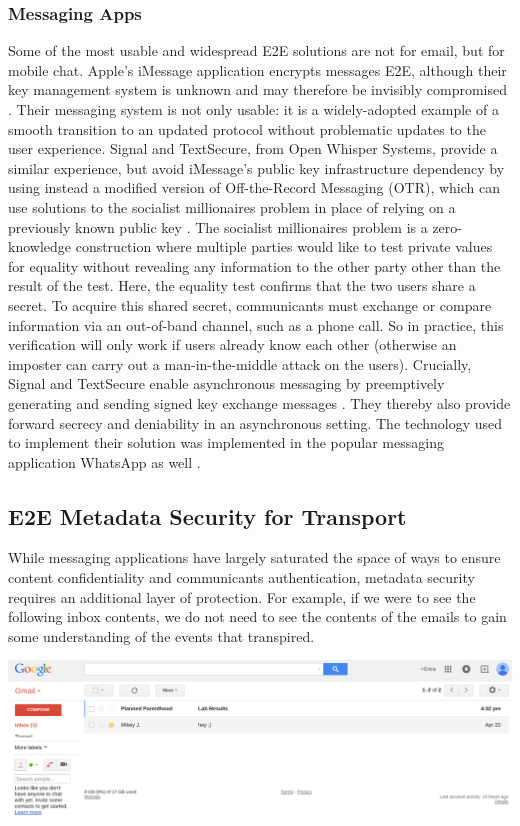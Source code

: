 \documentclass[pageno]{jpaper}
\begin{document}
\subsubsection{Messaging Apps}
Some of the most usable and widespread E2E solutions are not for email, but for mobile chat. Apple's iMessage application encrypts messages E2E, although their key management system is unknown and may therefore be invisibly compromised \cite{imessage}. Their messaging system is not only usable: it is a widely-adopted example of a smooth transition to an updated protocol without problematic updates to the user experience. Signal and TextSecure, from Open Whisper Systems, provide a similar experience, but avoid iMessage's public key infrastructure dependency by using instead a modified version of Off-the-Record Messaging (OTR), which can use solutions to the socialist millionaires problem in place of relying on a previously known public key \cite{borisov2004off}. The socialist millionaires problem is a zero-knowledge construction where multiple parties would like to test private values for equality without revealing any information to the other party other than the result of the test. Here, the equality test confirms that the two users share a secret. To acquire this shared secret, communicants must exchange or compare information via an out-of-band channel, such as a phone call. So in practice, this verification will only work if users already know each other (otherwise an imposter can carry out a man-in-the-middle attack on the users). Crucially, Signal and TextSecure enable asynchronous messaging by preemptively generating and sending signed key exchange messages \cite{whisper}. They thereby also provide forward secrecy and deniability in an asynchronous setting. The technology used to implement their solution was implemented in the popular messaging application WhatsApp as well \cite{whatsapp}.


\subsection{E2E Metadata Security for Transport}
While messaging applications have largely saturated the space of ways to ensure content confidentiality and communicants authentication, metadata security requires an additional layer of protection. For example, if we were to see the following inbox contents, we do not need to see the contents of the emails to gain some understanding of the events that transpired.

\includegraphics[width=\textwidth]{planned}
\end{document}
